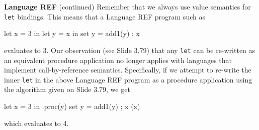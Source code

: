 \begin{minipage}[t]{\sw}
\slidenumber
\LARGE
{\bf Language REF} (continued)\exx
Remember that we always use value semantics for \verb'let' bindings.
This means that a Language REF program such as
{\Large
\begin{qv}
let
  x = 3
in
  let
    y = x
  in
    { set y = add1(y) ; x }
\end{qv}
}
evaluates to 3.\exx
Our observation (see Slide 3.79) that any \verb'let' can be re-written
as an equivalent procedure application no longer applies
with languages that implement call-by-reference semantics.
Specifically, if we attempt
to re-write the inner \verb'let' in the above Language REF program
as a procedure application using the algorithm given on Slide 3.79,
we get
{\Large
\begin{qv}
let
  x = 3 
in
  .proc(y) {set y = add1(y) ; x } (x)
\end{qv}
}
which evaluates to 4.
\end{minipage}
\clearpage
